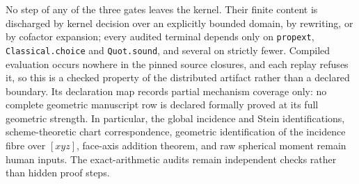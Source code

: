 No step of any of the three gates leaves the kernel.  Their finite content is
discharged by kernel decision over an explicitly bounded domain, by rewriting,
or by cofactor expansion; every audited terminal depends only on
\texttt{propext}, \texttt{Classical.choice} and \texttt{Quot.sound}, and
several on strictly fewer.  Compiled evaluation occurs nowhere in the pinned
source closures, and each replay refuses it, so this is a checked property of
the distributed artifact rather than a declared boundary.  Its declaration map records
partial mechanism coverage only: no complete geometric manuscript row is
declared formally proved at its full geometric strength.  In particular, the
global incidence and Stein identifications, scheme-theoretic chart
correspondence, geometric identification of the incidence fibre over \([xyz]\), face-axis addition
theorem, and raw spherical moment remain human inputs.  The exact-arithmetic
audits remain independent checks rather than hidden proof steps.
